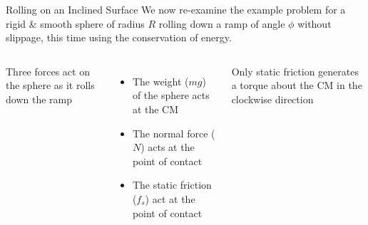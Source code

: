 \documentclass[12pt,compress,aspectratio=169]{beamer}
\begin{document}
\begin{frame}{Rolling on an Inclined Surface}
  We now re-examine the example problem for a rigid \& smooth sphere of radius
  $R$ rolling down a ramp of angle  $\phi$ without slippage, this time using
  the conservation of energy.

  \vspace{.2in}
  \begin{columns}

    Three forces act on the sphere as it rolls down the ramp
    \begin{itemize}
    \item The weight ($mg$) of the sphere acts at the CM
    \item The normal force ($N$) acts at the point of contact
    \item The static friction ($f_s$) act at the point of contact
    \end{itemize}
    Only static friction generates a torque about the CM in the clockwise
    direction
  \end{columns}
\end{frame}
\end{document}
